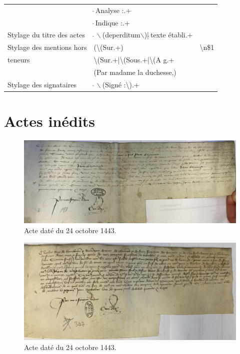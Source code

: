 \begin{center}
\begin{longtable}{|l|l|l|}
  & $\hat{~}$Analyse :.+ &  \\
  & $\hat{~}$Indique :.+ &  \\
Stylage du titre des actes & $\hat{~}\backslash$(deperditum$\backslash$)|$\hat{~}$texte établi.+ & \\
Stylage des mentions hors & (\textbackslash(Sur.+) & \textbackslash n\$1 \\ 
teneurs & \textbackslash(Sur.+|\textbackslash(Sous.+|\textbackslash(A g.+ &  \\
  & (Par madame la duchesse,) &  \\
Stylage des signataires & $\hat{~}\backslash$(Signé :\textbackslash).+ &  \\
  
\end{longtable}
\end{center}

\section*{Actes inédits}

\begin{figure}[ht]
\centering
\includegraphics[scale =0.13]{front/images/IMG-2553.jpg}
\caption*{Acte daté du 24 octobre 1443.}
\label{IMG-2553}
\end{figure}

\begin{figure}[ht]
\centering
\includegraphics[scale =0.12]{front/images/IMG-2568.jpg}
\caption*{Acte daté du 24 octobre 1443.}
\label{IMG-2568}
\end{figure}

